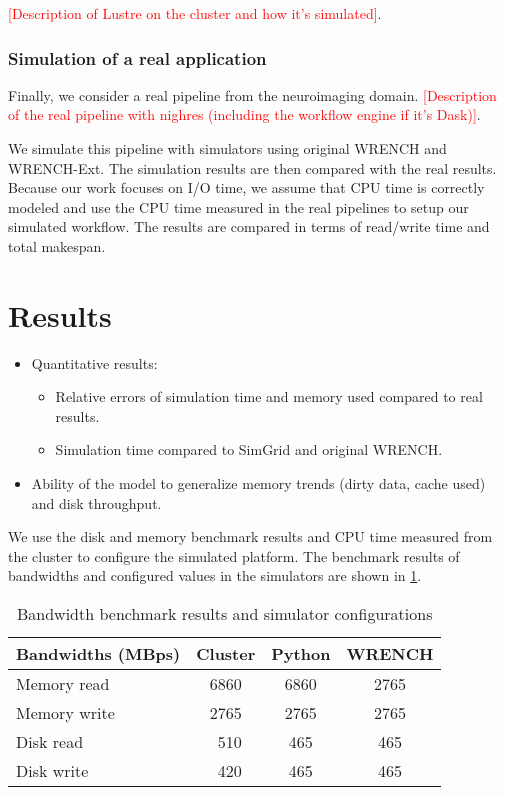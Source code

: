 \documentclass[conference]{IEEEtran}
\begin{document}
		    \textcolor{red}{[Description of Lustre on the cluster and how it's 
		    simulated]}. 
		    
		    \subsubsection{Simulation of a real application}

		    Finally, we consider a real pipeline from the neuroimaging domain. 			
			\textcolor{red}{[Description of the real pipeline with nighres 
			(including the workflow engine if it's Dask)]}.  			
			
			We simulate this pipeline with simulators using original WRENCH and 
			WRENCH-Ext. 
			The simulation results are then compared with the real results. 
			Because our work focuses on I/O time, we assume that CPU time is 
			correctly modeled and use the CPU time measured in the real pipelines 
			to setup our simulated workflow. The results are compared in terms of 
			read/write time and total makespan.

	\section{Results}
	
		\begin{itemize}

			\item Quantitative results: 
				\begin{itemize}
					\item Relative errors of simulation time and memory used compared to real results.
					\item Simulation time compared to SimGrid and original WRENCH.
				\end{itemize} 

			\item Ability of the model to generalize memory trends (dirty data, cache used) and disk throughput.

			\end{itemize}
			
		We use the disk and memory benchmark results and CPU time measured from 
		the cluster to configure the simulated platform. The benchmark results of 
		bandwidths and configured values in the simulators are shown in \ref{table:benchmark}.
		
		\begin{table}
		\centering
		\begin{tabular}{|l|c|c|c|}
		\hline
			Bandwidths (MBps)  & Cluster & Python & WRENCH\\
		\hline
			Memory read  & 6860	& 6860	 & 2765\\
			Memory write & 2765	& 2765 & 2765\\
			Disk read & ~510 & 465 & 465\\
			Disk write & ~420 & 465	 & 465\\
		\hline
		\end{tabular}
		\caption{Bandwidth benchmark results and simulator configurations}
		\label{table:benchmark}
		\end{table}
				
\end{document}
